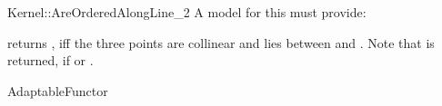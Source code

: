 \begin{ccRefFunctionObjectConcept}{Kernel::AreOrderedAlongLine_2}
A model for this must provide:


         {returns , iff the three points are collinear and 
           lies between  and .
          Note that  is returned, if  or
          .}

\ccRefines
AdaptableFunctor

\ccSeeAlso
{}  \\

\end{ccRefFunctionObjectConcept}
